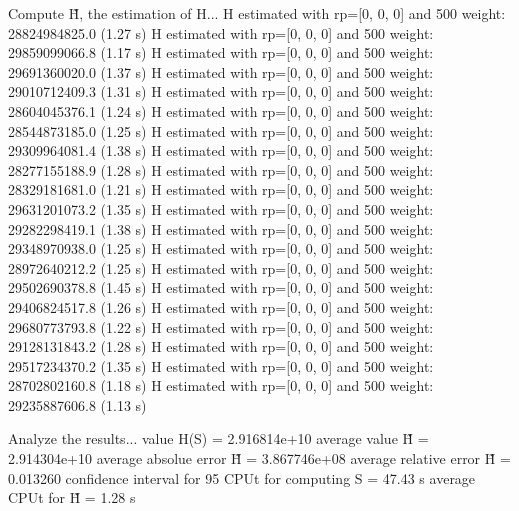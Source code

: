 Compute H̃, the estimation of H...
  H estimated with rp=[0, 0, 0] and 500 weight:  28824984825.0  (1.27 s)
  H estimated with rp=[0, 0, 0] and 500 weight:  29859099066.8  (1.17 s)
  H estimated with rp=[0, 0, 0] and 500 weight:  29691360020.0  (1.37 s)
  H estimated with rp=[0, 0, 0] and 500 weight:  29010712409.3  (1.31 s)
  H estimated with rp=[0, 0, 0] and 500 weight:  28604045376.1  (1.24 s)
  H estimated with rp=[0, 0, 0] and 500 weight:  28544873185.0  (1.25 s)
  H estimated with rp=[0, 0, 0] and 500 weight:  29309964081.4  (1.38 s)
  H estimated with rp=[0, 0, 0] and 500 weight:  28277155188.9  (1.28 s)
  H estimated with rp=[0, 0, 0] and 500 weight:  28329181681.0  (1.21 s)
  H estimated with rp=[0, 0, 0] and 500 weight:  29631201073.2  (1.35 s)
  H estimated with rp=[0, 0, 0] and 500 weight:  29282298419.1  (1.38 s)
  H estimated with rp=[0, 0, 0] and 500 weight:  29348970938.0  (1.25 s)
  H estimated with rp=[0, 0, 0] and 500 weight:  28972640212.2  (1.25 s)
  H estimated with rp=[0, 0, 0] and 500 weight:  29502690378.8  (1.45 s)
  H estimated with rp=[0, 0, 0] and 500 weight:  29406824517.8  (1.26 s)
  H estimated with rp=[0, 0, 0] and 500 weight:  29680773793.8  (1.22 s)
  H estimated with rp=[0, 0, 0] and 500 weight:  29128131843.2  (1.28 s)
  H estimated with rp=[0, 0, 0] and 500 weight:  29517234370.2  (1.35 s)
  H estimated with rp=[0, 0, 0] and 500 weight:  28702802160.8  (1.18 s)
  H estimated with rp=[0, 0, 0] and 500 weight:  29235887606.8  (1.13 s)

Analyze the results...
  value H(S)                  = 2.916814e+10 
  average value H̃             = 2.914304e+10 
  average absolue error H̃     = 3.867746e+08 
  average relative error H̃    = 0.013260 
  confidence interval for 95%
  CPUt for computing S         = 47.43 s
  average CPUt for H̃           = 1.28 s

